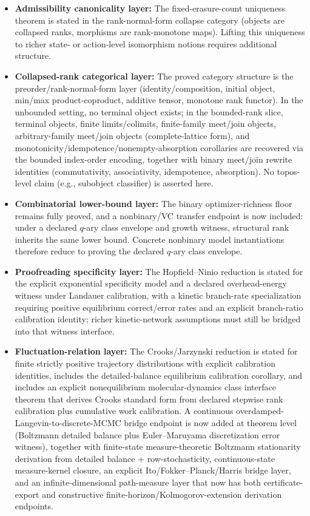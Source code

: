 \begin{itemize}
	\item \textbf{Admissibility canonicality layer:} The fixed-erasure-count uniqueness theorem is stated in the rank-normal-form collapse category (objects are collapsed ranks, morphisms are rank-monotone maps). Lifting this uniqueness to richer state- or action-level isomorphism notions requires additional structure.
	\item \textbf{Collapsed-rank categorical layer:} The proved category structure is the preorder/rank-normal-form layer (identity/composition, initial object, min/max product-coproduct, additive tensor, monotone rank functor). In the unbounded setting, no terminal object exists; in the bounded-rank slice, terminal objects, finite limits/colimits, finite-family meet/join objects, arbitrary-family meet/join objects (complete-lattice form), and monotonicity/idempotence/nonempty-absorption corollaries are recovered via the bounded index-order encoding, together with binary meet/join rewrite identities (commutativity, associativity, idempotence, absorption). No topos-level claim (e.g., subobject classifier) is asserted here.
	\item \textbf{Combinatorial lower-bound layer:} The binary optimizer-richness floor remains fully proved, and a nonbinary/VC transfer endpoint is now included: under a declared $q$-ary class envelope and growth witness, structural rank inherits the same lower bound. Concrete nonbinary model instantiations therefore reduce to proving the declared $q$-ary class envelope.
	\item \textbf{Proofreading specificity layer:} The Hopfield--Ninio reduction is stated for the explicit exponential specificity model and a declared overhead-energy witness under Landauer calibration, with a kinetic branch-rate specialization requiring positive equilibrium correct/error rates and an explicit branch-ratio calibration identity; richer kinetic-network assumptions must still be bridged into that witness interface.
	\item \textbf{Fluctuation-relation layer:} The Crooks/Jarzynski reduction is stated for finite strictly positive trajectory distributions with explicit calibration identities, includes the detailed-balance equilibrium calibration corollary, and includes an explicit nonequilibrium molecular-dynamics class interface theorem that derives Crooks standard form from declared stepwise rank calibration plus cumulative work calibration. A continuous overdamped-Langevin-to-discrete-MCMC bridge endpoint is now added at theorem level (Boltzmann detailed balance plus Euler--Maruyama discretization error witness), together with finite-state measure-theoretic Boltzmann stationarity derivation from detailed balance + row-stochasticity, continuous-state measure-kernel closure, an explicit Ito/Fokker--Planck/Harris bridge layer, and an infinite-dimensional path-measure layer that now has both certificate-export and constructive finite-horizon/Kolmogorov-extension derivation endpoints.

\end{itemize}
